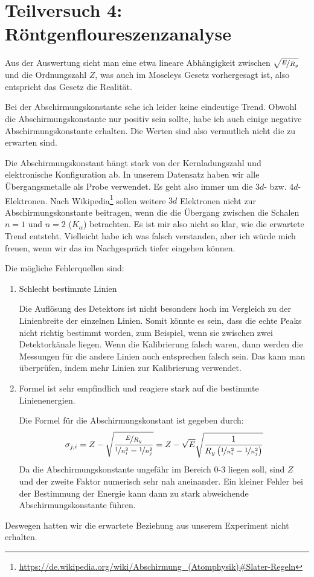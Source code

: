 \section{Teilversuch 4: Röntgenfloureszenzanalyse}
	Aus der Auswertung sieht man eine etwa lineare Abhängigkeit zwischen $\sqrt{\nicefrac{E}{R_y}}$ und die Ordnungszahl $Z$, was auch im Moseleys Gesetz vorhergesagt ist, also entspricht das Gesetz die Realität. 

	Bei der Abschirmungskonstante sehe ich leider keine eindeutige Trend. Obwohl die Abschirmungskonstante nur positiv sein sollte, habe ich auch einige negative Abschirmungskonstante erhalten. Die Werten sind also vermutlich nicht die zu erwarten sind. 

	Die Abschirmungskonstant hängt stark von der Kernladungszahl und elektronische Konfiguration ab. In unserem Datensatz haben wir alle Übergangsmetalle als Probe verwendet. Es geht also immer um die $3d$- bzw. $4d$-Elektronen. Nach Wikipedia\footnote{\url{https://de.wikipedia.org/wiki/Abschirmung\_(Atomphysik)\#Slater-Regeln}} sollen weitere $3d$ Elektronen nicht zur Abschirmungskonstante beitragen, wenn die die Übergang zwischen die Schalen $n=1$ und $n=2$ ($K_\alpha$) betrachten. Es ist mir also nicht so klar, wie die erwartete Trend entsteht. Vielleicht habe ich was falsch verstanden, aber ich würde mich freuen, wenn wir das im Nachgespräch tiefer eingehen können.

	\newpage
	Die mögliche Fehlerquellen sind:
	\begin{enumerate}
		\item Schlecht bestimmte Linien

			Die Auflösung des Detektors ist nicht besonders hoch im Vergleich zu der Linienbreite der einzelnen Linien. Somit könnte es sein, dass die echte Peaks nicht richtig bestimmt worden, zum Beispiel, wenn sie zwischen zwei Detektorkänale liegen. Wenn die Kalibrierung falsch waren, dann werden die Messungen für die andere Linien auch entsprechen falsch sein. Das kann man überprüfen, indem mehr Linien zur Kalibrierung verwendet. 

		\item Formel ist sehr empfindlich und reagiere stark auf die bestimmte Linienenergien. 

			Die Formel für die Abschirmungskonstant ist gegeben durch:
			\begin{align}
				\sigma_{j,i} = Z - \sqrt{\frac{\nicefrac{E}{R_y}}{\nicefrac{1}{n_i^2} - \nicefrac{1}{n_j^2}}} =
				Z - \sqrt{E}\sqrt{\frac{1}{R_y\left(\nicefrac{1}{n_i^2} - \nicefrac{1}{n_j^2}\right)}}
			\end{align}
			Da die Abschirmungskonstante ungefähr im Bereich $0$-$3$ liegen soll, sind $Z$ und der zweite Faktor numerisch sehr nah aneinander. Ein kleiner Fehler bei der Bestimmung der Energie kann dann zu stark abweichende Abschirmungskonstante führen. 
	\end{enumerate}
	Deswegen hatten wir die erwartete Beziehung aus unserem Experiment nicht erhalten. 